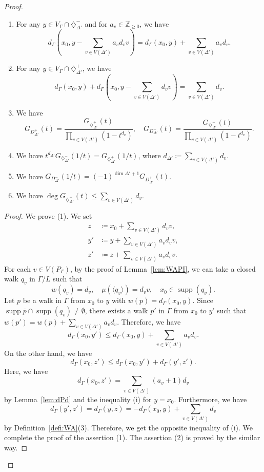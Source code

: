 \documentclass[ALCO,published]{cedram}
\theoremstyle{remark}
\begin{document}
\begin{proof}
\begin{claim}
\begin{enumerate}
\item 
For any $y \in V_{\Gamma} \cap \diamondsuit^- _{\Delta '}$
and for $a_v \in \mathbb{Z}_{\ge 0}$, 
we have 
\[
d_{\Gamma} \left( x_0, y - \sum _{v \in V(\Delta ')} a_v d_v v \right) 
= d_{\Gamma} (x_0, y) + \sum _{v \in V(\Delta ')} a_v d_v. 
\]

\item
For any $y \in V_{\Gamma} \cap \diamondsuit^+ _{\Delta '}$, 
we have
\[
d_{\Gamma} (x_0, y) + d_{\Gamma} \left( x_0, y - \sum _{v \in V(\Delta ')} d_v v \right)
= \sum _{v \in V(\Delta ')} d_v.
\]

\item We have
\[
G_{D^+ _{\Delta '}}(t)
= \frac{G_{\diamondsuit ^+ _{\Delta '}}(t)}{\prod _{v \in V(\Delta ')} (1 - t^{d_v})}, \quad
G_{D^- _{\Delta '}}(t)
= \frac{G_{\diamondsuit ^- _{\Delta '}}(t)}{\prod _{v \in V(\Delta ')} (1 - t^{d_v})}. 
\]

\item
We have $t^{d_{\Delta '}} G_{\diamondsuit ^- _{\Delta '}}(1/t) 
= G_{\diamondsuit ^+ _{\Delta '}}(1/t)$, where 
$d_{\Delta '} \coloneqq  \sum _{v \in V(\Delta ')} d_v$.

\item
We have 
$G_{D^- _{\Delta '}}(1/t) = (-1)^{\dim \Delta ' +1}G_{D^+ _{\Delta '}}(t)$. 

\item
We have 
$\deg G_{\diamondsuit ^+ _{\Delta '}}(t) \le \sum _{v \in V(\Delta ')} d_v$. 
\end{enumerate}
\end{claim}
\begin{proof}
We prove (1). 
We set 
\begin{align*}
z &\coloneqq  x_0 + \sum _{v \in V(\Delta ')} d_v v, \\
y'&\coloneqq  y + \sum _{v \in V(\Delta ')} a_v d_v v, \\
z'&\coloneqq  z + \sum _{v \in V(\Delta ')} a_v d_v v. 
\end{align*}
For each $v \in V(P_{\Gamma})$, by the proof of Lemma~\ref{lem:WAPI},  
we can take a closed walk $q_v$ in $\Gamma /L$ such that 
\[
w(q_v) = d_v, \quad 
\mu(\langle q_v \rangle) = d_v v, \quad
x_0 \in \operatorname{supp}(q_v). 
\]
Let $p$ be a walk in $\Gamma$ from $x_0$ to $y$ with $w(p) = d_{\Gamma}(x_0, y)$. 
Since $\operatorname{supp}{\overline{p}} \cap \operatorname{supp}(q_v) \not = \emptyset$, 
there exists a walk $p'$ in $\Gamma$ from $x_0$ to $y'$ such that 
$w(p') = w(p) + \sum _{v \in V(\Delta ')} a_v d_v$. 
Therefore, we have
\[
d_{\Gamma} (x_0, y') 
\le d_{\Gamma} (x_0, y) + \sum _{v \in V(\Delta ')} a_v d_v. \tag{i}
\]
On the other hand, we have 
\[
d_{\Gamma} (x_0, z') \le d_{\Gamma} (x_0, y') + d_{\Gamma} (y', z'). 
\]
Here, we have 
\[
d_{\Gamma} (x_0, z') = \sum _{v \in V(\Delta ')} (a_v +1) d_v
\]
by Lemma~\ref{lem:dPd} and the inequality (i) for $y = x_0$. 
Furthermore, we have 
\[
d_{\Gamma} (y', z') = d_{\Gamma} (y, z) = -d_{\Gamma}(x_0, y) + \sum _{v \in V(\Delta ')} d_v
\]
by Definition~\ref{defi:WA}(3). 
Therefore, we get the opposite inequality of (i). 
We complete the proof of the assertion (1). 
The assertion (2) is proved by the similar way. 


\end{proof}
\end{proof}
\end{document}
